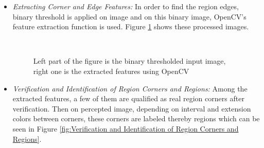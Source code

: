 \documentclass[runningheads,a4paper]{llncs}
\begin{document}
\begin{itemize}
 \item \emph{Extracting Corner and Edge Features: } In order to find the region edges, binary threshold is applied on image and on this binary image, OpenCV's \cite{opencv} feature extraction function is used. Figure \ref{fig:Extracting Corner and Edge Features} shows these processed images.
\begin{figure}
\centering
\mbox{\quad
{}}
\caption{Left part of the figure is the binary thresholded input image, right one is the extracted features using OpenCV} \label{fig:Extracting Corner and Edge Features}
\end{figure}
 \item \emph{Verification and Identification of Region Corners and Regions: } Among the extracted features, a few of them are qualified as real region corners after verification. Then on percepted image, depending on interval and extension colors between corners, these corners are labeled thereby regions which can be seen in Figure \ref{fig:Verification and Identification of Region Corners and Regions}.
\begin{figure}
\centering
\mbox{\quad
}
\end{figure}
\end{itemize}
\end{document}
